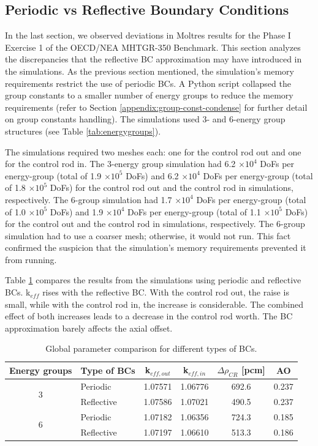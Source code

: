 \subsection{Periodic vs Reflective Boundary Conditions}
\label{sec:bench-bcs}

In the last section, we observed deviations in Moltres results for the Phase I Exercise 1 of the OECD/NEA MHTGR-350 Benchmark.
This section analyzes the discrepancies that the reflective \gls{BC} approximation may have introduced in the simulations.
As the previous section mentioned, the simulation's memory requirements restrict the use of periodic BCs.
A Python script collapsed the group constants to a smaller number of energy groups to reduce the memory requirements (refer to Section \ref{appendix:group-const-condense} for further detail on group constants handling).
The simulations used 3- and 6-energy group structures (see Table \ref{tab:energygroups}).

The simulations required two meshes each: one for the control rod out and one for the control rod in.
The 3-energy group simulation had 6.2 $\times 10^4$ DoFs per energy-group (total of 1.9 $\times 10^5$ DoFs) and 6.2 $\times 10^4$ DoFs per energy-group (total of 1.8 $\times 10^5$ DoFs) for the control rod out and the control rod in simulations, respectively.
The 6-group simulation had 1.7 $\times 10^4$ DoFs per energy-group (total of 1.0 $\times 10^5$ DoFs) and 1.9 $\times 10^4$ DoFs per energy-group (total of 1.1 $\times 10^5$ DoFs) for the control out and the control rod in simulations, respectively.
The 6-group simulation had to use a coarser mesh; otherwise, it would not run.
This fact confirmed the suspicion that the simulation's memory requirements prevented it from running.

Table \ref{tab:benchmark-bc} compares the results from the simulations using periodic and reflective BCs.
k$_{eff}$ rises with the reflective BC.
With the control rod out, the raise is small, while with the control rod in, the increase is considerable.
The combined effect of both increases leads to a decrease in the control rod worth.
The BC approximation barely affects the axial offset.

\begin{table}[htbp!]
  \centering
  \caption{Global parameter comparison for different types of BCs.}
  \begin{tabular}{clcccc}
  \toprule
  Energy groups       & Type of BCs & k$_{eff, out}$ & k$_{eff, in}$ & $\Delta \rho_{CR}$ [pcm] & AO \\
  \midrule
  \multirow{2}{*}{3}  & Periodic     & 1.07571		& 1.06776		& 692.6		& 0.237		\\
                      & Reflective   & 1.07586	  & 1.07021   & 490.5		& 0.237	  \\ \hline
  \multirow{2}{*}{6}  & Periodic     & 1.07182		& 1.06356		& 724.3	  & 0.185  	\\
                      & Reflective   & 1.07197   	& 1.06610 	& 513.3		& 0.186		\\  
  \bottomrule
  \end{tabular}
  \label{tab:benchmark-bc}
\end{table}

